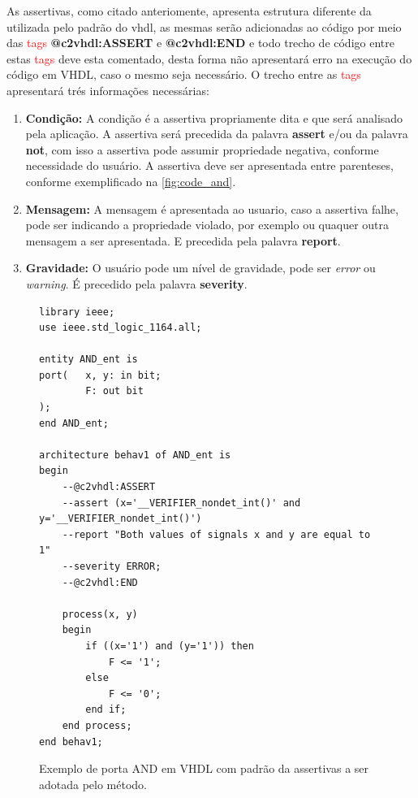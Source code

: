 \par
As assertivas, como citado anteriomente, apresenta estrutura diferente da utilizada pelo padrão do vhdl, as mesmas serão adicionadas ao código por meio das \textcolor{red}{tags} \textbf{@c2vhdl:ASSERT} e \textbf{@c2vhdl:END} e todo trecho de código entre estas \textcolor{red}{tags} deve esta comentado, desta forma não apresentará erro na execução do código em VHDL, caso o mesmo seja necessário. O trecho entre as \textcolor{red}{tags} apresentará trés informações necessárias:
\begin{enumerate}
\item \textbf{Condição:} A condição é a assertiva propriamente dita e que será analisado pela aplicação. A assertiva será precedida da palavra \textbf{assert} e/ou da palavra \textbf{not}, com isso a assertiva pode assumir propriedade negativa, conforme necessidade do usuário. A assertiva deve ser apresentada entre parenteses, conforme exemplificado na \autoref{fig:code_and}.
\item \textbf{Mensagem:} A mensagem é apresentada ao usuario, caso a assertiva falhe, pode ser indicando a propriedade violado, por exemplo ou quaquer outra mensagem a ser apresentada. E precedida pela palavra \textbf{report}.
\item \textbf{Gravidade:} O usuário pode um nível de gravidade, pode ser \textit{error} ou \textit{warning}. É precedido pela palavra \textbf{severity}.
\end{enumerate}

\begin{figure}[thp]
\caption{\label{fig:code_and} Exemplo de porta AND em VHDL com padrão da assertivas a ser adotada pelo método.}
	\begin{center}
    \begin{minipage}{0.6\textwidth}
    \begin{lstlisting}       
library ieee;
use ieee.std_logic_1164.all;

entity AND_ent is
port(   x, y: in bit;
        F: out bit
);
end AND_ent;

architecture behav1 of AND_ent is
begin
    --@c2vhdl:ASSERT
    --assert (x='__VERIFIER_nondet_int()' and y='__VERIFIER_nondet_int()')
    --report "Both values of signals x and y are equal to 1"
    --severity ERROR;
    --@c2vhdl:END
    
    process(x, y)
    begin
        if ((x='1') and (y='1')) then
            F <= '1';
        else
            F <= '0';
        end if;
    end process;
end behav1;

\end{lstlisting}
    \end{minipage}
	\end{center}
\end{figure}

